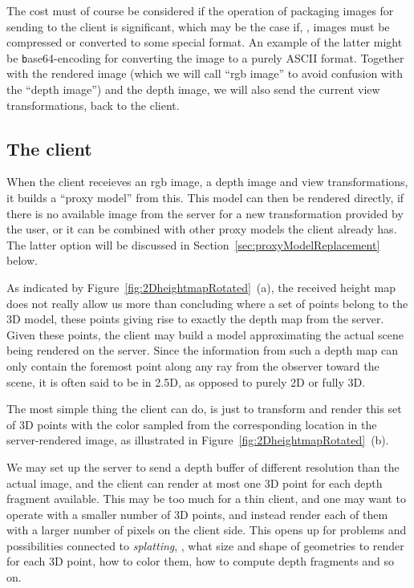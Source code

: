 The cost must of course be considered if the operation of packaging images for
sending to the client is significant, which may be the case if, \eg, images must
be compressed or converted to some special format. An example of the latter
might be {\texttt base64}-encoding for converting the image to a purely ASCII
format. Together with the rendered image (which we will call ``rgb image'' to
avoid confusion with the ``depth image'') and the depth image, we will also send
the current view transformations, back to the client.


\subsection{The client}

When the client receieves an rgb image, a depth image and view transformations,
it builds a ``proxy model'' from this. This model can then be rendered directly,
if there is no available image from the server for a new transformation provided
by the user, or it can be combined with other proxy models the client already
has. The latter option will be discussed in
Section~\ref{sec:proxyModelReplacement} below.



As indicated by Figure~\ref{fig:2DheightmapRotated}~(a), the received
height map does not really allow us more than concluding where a set of points
belong to the 3D model, these points giving rise to exactly the depth map from
the server. Given these points, the client may build a model approximating the
actual scene being rendered on the server. Since the information from such a
depth map can only contain the foremost point along any ray from the observer
toward the scene, it is often said to be in 2.5D, as opposed to purely 2D or
fully 3D.

The most simple thing the client can do, is just to transform and render this
set of 3D points with the color sampled from the corresponding location in the
server-rendered image, as illustrated in
Figure~\ref{fig:2DheightmapRotated}~(b).

We may set up the server to send a depth buffer of different resolution than the
actual image, and the client can render at most one 3D point for each depth
fragment available. This may be too much for a thin client, and one may want to
operate with a smaller number of 3D points, and instead render each of them with
a larger number of pixels on the client side. This opens up for problems and
possibilities connected to {\em splatting}, \eg, what size and shape of
geometries to render for each 3D point, how to color them, how to compute depth
fragments and so on.

